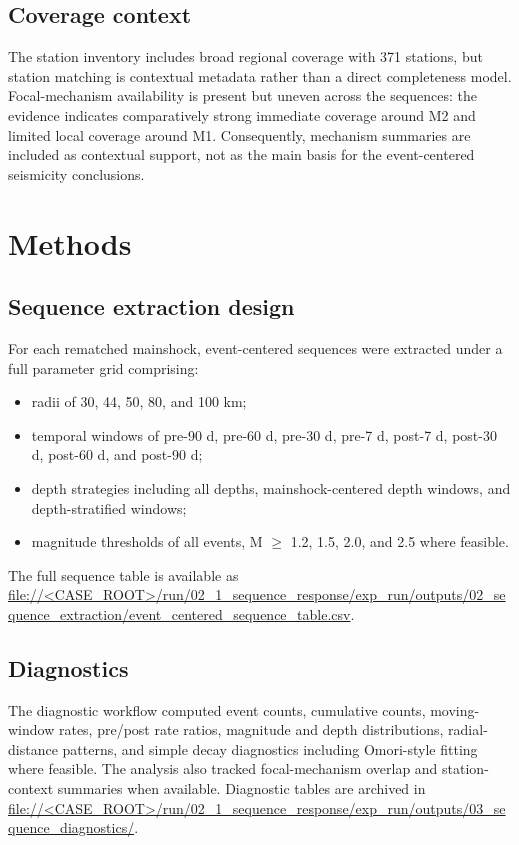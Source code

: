 \documentclass[11pt]{article}
\begin{document}
\subsection{Coverage context}
The station inventory includes broad regional coverage with 371 stations, but station matching is contextual metadata rather than a direct completeness model. Focal-mechanism availability is present but uneven across the sequences: the evidence indicates comparatively strong immediate coverage around M2 and limited local coverage around M1. Consequently, mechanism summaries are included as contextual support, not as the main basis for the event-centered seismicity conclusions.

\section{Methods}
\subsection{Sequence extraction design}
For each rematched mainshock, event-centered sequences were extracted under a full parameter grid comprising:
\begin{itemize}[leftmargin=1.2em]
    \item radii of 30, 44, 50, 80, and 100 km;
    \item temporal windows of pre-90 d, pre-60 d, pre-30 d, pre-7 d, post-7 d, post-30 d, post-60 d, and post-90 d;
    \item depth strategies including all depths, mainshock-centered depth windows, and depth-stratified windows;
    \item magnitude thresholds of all events, M $\geq$ 1.2, 1.5, 2.0, and 2.5 where feasible.
\end{itemize}
The full sequence table is available as \url{file://<CASE_ROOT>/run/02_1_sequence_response/exp_run/outputs/02_sequence_extraction/event_centered_sequence_table.csv}.

\subsection{Diagnostics}
The diagnostic workflow computed event counts, cumulative counts, moving-window rates, pre/post rate ratios, magnitude and depth distributions, radial-distance patterns, and simple decay diagnostics including Omori-style fitting where feasible. The analysis also tracked focal-mechanism overlap and station-context summaries when available. Diagnostic tables are archived in \url{file://<CASE_ROOT>/run/02_1_sequence_response/exp_run/outputs/03_sequence_diagnostics/}.
\end{document}
